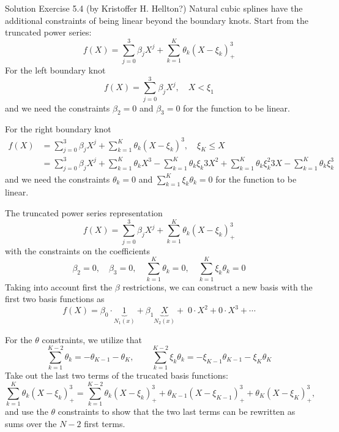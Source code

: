 \documentclass[10pt]{beamer}
\begin{document}
\begin{frame}{Solution Exercise 5.4 (by Kristoffer H. Hellton?)}
Natural cubic splines have the additional constraints of being linear beyond the boundary knots. Start from the truncated power series:
$$f(X) = \sum_{j=0}^{3}\beta_{j}X^j+ \sum_{k=1}^K\theta_{k}(X-\xi_{k})^3_{+}$$ 
\pause
For the left boundary knot 
$$f(X) = \sum_{j=0}^{3}\beta_{j}X^j, \quad X < \xi_{1} $$
and we need the constraints $\beta_{2}=0$ and $\beta_{3}=0$ for the function to be linear.  
\end{frame}

\begin{frame}
For the right boundary knot
\begin{align*}
f(X) &= \sum_{j=0}^{3}\beta_{j}X^j+\sum_{k=1}^K\theta_{k}(X-\xi_{k})^3, \quad  \xi_{K} \leq X \\
&= \sum_{j=0}^{3}\beta_{j}X^j + \sum_{k=1}^K\theta_{k}X^3 - \sum_{k=1}^K\theta_{k}\xi_{k} 3 X^2  + \sum_{k=1}^K\theta_{k} \xi_{k}^2 3 X  - \sum_{k=1}^K\theta_{k} \xi_{k}^3 
\end{align*}
\pause
and we need the constraints $ \theta_{k}=0 $ and  $\sum_{k=1}^K \xi_{k}\theta_{k}=0$ for the function to be linear.  
\end{frame}


\begin{frame}
The truncated power series representation
$$f(X) = \sum_{j=0}^{3}\beta_{j}X^j+ \sum_{k=1}^K\theta_{k}(X-\xi_{k})^3_{+}$$
with the  constraints on the coefficients
$$\beta_{2}=0,\quad\beta_{3}=0, \quad \sum_{k=1}^K  \theta_{k}=0,\quad\sum_{k=1}^K \xi_{k}\theta_{k}=0$$
\pause
Taking into account first the $\beta$ restrictions, we can construct a new basis with the first two basis functions as
$$ f(X) = \beta_{0}\cdot \underbrace{1}_{N_{1}(x)}+\beta_{1}\underbrace{X}_{N_{2}(x)}+\;0 \cdot X^2+0\cdot X^3+\cdots $$
\end{frame}

\begin{frame}
For the $\theta$ constraints, we utilize that 
$$\sum_{k=1}^{K-2}  \theta_{k}= -\theta_{K-1}-\theta_{K},\qquad\sum_{k=1}^{K-2} \xi_{k}\theta_{k}=- \xi_{K-1}\theta_{K-1}- \xi_{K}\theta_{K} $$
\pause
Take out the last two terms of the trucated basis functions: \pause
$$\sum_{k=1}^K\theta_{k}(X-\xi_{k})^3_{+} = \sum_{k=1}^{K-2}\theta_{k}(X-\xi_{k})^3_{+} + \theta_{K-1}(X-\xi_{K-1})^3_{+}+\theta_{K}(X-\xi_{K})^3_{+}, $$\pause
and use the $\theta$ constraints to show that the two last terms can be rewritten as sums over the $N-2$ first terms.
\end{frame}
\end{document}
